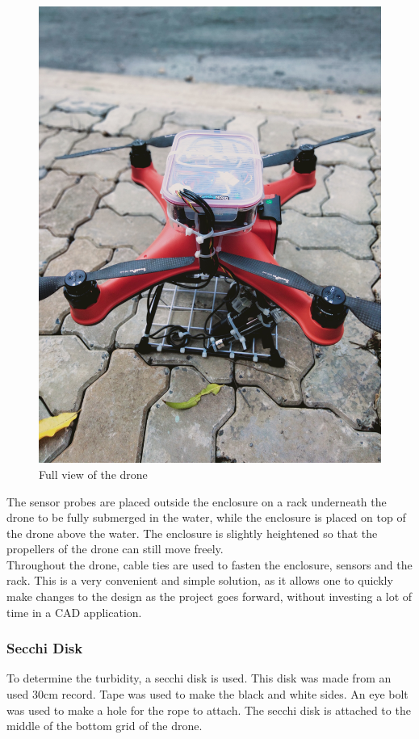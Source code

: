 \begin{figure}[h]
\begin{minipage}[b]{0.5\textwidth}
    \includegraphics[width=\textwidth]{070_design/package/53_mount.jpg}
    \caption{Full view of the drone}
  \end{minipage}
\end{figure}

The sensor probes are placed outside the enclosure on a rack underneath the drone to be fully submerged in the water, while the enclosure is placed on top of the drone above the water. The enclosure is slightly heightened so that the propellers of the drone can still move freely.\\

Throughout the drone, cable ties are used to fasten the enclosure, sensors and the rack. This is a very convenient and simple solution, as it allows one to quickly make changes to the design as the project goes forward, without investing a lot of time in a \gls{CAD} application. 

\newpage
\subsubsection{Secchi Disk}
To determine the turbidity, a secchi disk is used. This disk was made from an used 30\gls{cm} record. Tape was used to make the black and white sides. An eye bolt was used to make a hole for the rope to attach. The secchi disk is attached to the middle of the bottom grid of the drone.

